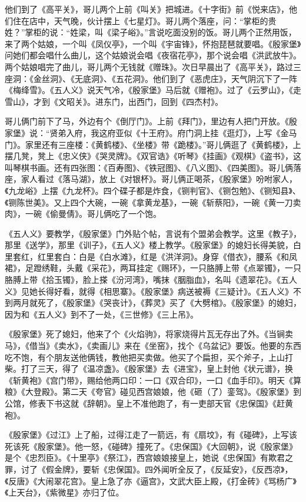 \documentclass[12pt,UTF8]{ctexbook}
\begin{document}
他们到了《高平关》，哥儿两个上前《叫关》把城进。《十字街》前《悦来店》，他们住在店中，天气晚，伙计摆上《七星灯》。哥儿两个落座，问：“掌柜的贵姓？”掌柜的说：“姓梁，叫《梁子峪》。”言说吃面没别的饭。哥儿两个正然用饭，来了两个姑娘，一个叫《凤仪亭》，一个叫《宇宙锋》，怀抱琵琶就要唱。《殷家堡》问她们都会唱什么曲儿，这个姑娘说会唱《夜宿花亭》，那个说会唱《洪武放牛》。两个姑娘唱完了曲儿，哥儿两个无钱就《赠珠》。次日早晨出了《高平关》，路过三座洞：《金丝洞》、《无底洞》、《五花洞》。他们到了《恶虎庄》，天气阴沉下了一阵《梅绛雪》。《五人义》说天气冷，《殷家堡》马后就《赠袍》。过了《云罗山》，《走雪山》，才到《文昭关》。进东门，出西门，回到《四杰村》。

哥儿俩门前下了马，外边有个《倒厅门》。上前《拜门》，里边有人把门开放。《殷家堡》说：“贤弟入府，我这府亚似《十王府》。府门洞上挂《逛灯》，上写《金马门》。家里还有三座楼：《黄鹤楼》、《坐楼》带《跪楼》。”哥儿俩逛了《黄鹤楼》，上摆几凳，凳上《忠义侠》《哭灵牌》。《双官诰》《听琴》《挂画》《观棋》《盗书》，这叫琴棋书画。还有四张图：《百寿图》、《铁冠图》、《八义图》、《四美图》。哥儿俩落座，家人看过《落马湖》，放上《对银杯》。哥儿俩正喝茶，《殷家堡》吩咐家人，《九龙峪》上摆《九龙杯》。四个碟子都是炸食，《铡判官》、《铡包勉》、《铡知县》、《铡陈世美》。又上四个大碗，一碗《拿黄龙基》，一碗《斩蔡阳》，一碗《黄一刀卖肉》，一碗《偷曼倩》。哥儿俩吃了一个饱。

《五人义》要教学，《殷家堡》门外贴个帖，言说有个盟弟会教学。这里《教子》，那里《送学》，那里《训子》，《五人义》楼上教学。《殷家堡》的媳妇长得美貌，白里套红，红里套白：白是《白水滩》，红是《洪洋洞》。身穿《借衣》，腰系《和凤裙》，足蹬绣鞋，头戴《采花》，两耳挂定《赐环》，一只胳膊上带《点翠镯》，一只胳膊上带《拾玉镯》，脸上搽《汾河湾》，嘴抹《胭脂血》，名叫《遗翠花》。《五人义》见她长得好看，就得《相思寨》。《殷家堡》病送被褥《三疑计》。《五人义》不到两月就死了，《殷家堡》《哭丧计》，《葬灵》买了《大劈棺》。《殷家堡》的媳妇，因为和《五人义》到不了一处，《三世修》《三上吊》。

《殷家堡》死了媳妇，他来了个《火焰驹》，将家烧得片瓦无存出了外。《当锏卖马》，《借当》《卖水》，《卖画儿》来在《坐窑》，找个《乌盆记》要饭。他要的东西吃不饱，有个朋友送他俩钱，教他把买卖做。他买了个扁担，买个斧子，上山打柴。打了三天，得了《温凉盏》。《殷家堡》去《进宝》，皇上封他《状元谱》，换《斩黄袍》《宫门带》，赐给他两口印：一口《双合印》，一口《血手印》。明天《算粮》《大登殿》。第二天《夸官》碰见西宫娘娘，他《砸（了）銮驾》。《殷家堡》到公馆，修表下书这就《辞朝》。皇上不准他跑了，有一吏部天官《忠保国》《赶黄袍》。

《殷家堡》《过江》上了船，过得江走了一箭远，有《扇坟》，有《碰碑》，上写该死该死《殷家堡》。他一怒，《碰碑》撞死了。《忠保国》《大回朝》，说《殷家堡》是个《忠烈臣》。《十里亭》《祭江》，西宫娘娘接皇上，她说《忠保国》有欺君之罪，讨了《假金牌》，要斩《忠保国》。四外闻听全反了，《反延安》，《反西凉》，《反唐》《大闹翠花宫》。皇上急了亦《逼宫》，文武大臣上殿，《打金砖》《骂杨广》《上天台》，《紫微星》亦归了位。
\end{document}
